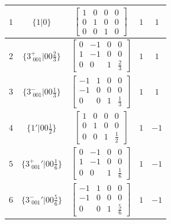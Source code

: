 \documentclass[fleqn,8pt]{jsarticle}
\begin{document}
\begin{longtable}{ccccc}
$ 1 $ & $ \{1|0\} $ & $ \begin{bmatrix} 1 & 0 & 0 & 0 \\ 0 & 1 & 0 & 0 \\ 0 & 0 & 1 & 0 \end{bmatrix} $ & $ 1 $ & $ 1 $ \\ \hline
$ 2 $ & $ \{3^{+}_{\,\,001}|0 0 \frac{2}{3}\} $ & $ \begin{bmatrix} 0 & -1 & 0 & 0 \\ 1 & -1 & 0 & 0 \\ 0 & 0 & 1 & \frac{2}{3} \end{bmatrix} $ & $ 1 $ & $ 1 $ \\ \hline
$ 3 $ & $ \{3^{-}_{\,\,001}|0 0 \frac{1}{3}\} $ & $ \begin{bmatrix} -1 & 1 & 0 & 0 \\ -1 & 0 & 0 & 0 \\ 0 & 0 & 1 & \frac{1}{3} \end{bmatrix} $ & $ 1 $ & $ 1 $ \\ \hline
$ 4 $ & $ \{1{}'|0 0 \frac{1}{2}\} $ & $ \begin{bmatrix} 1 & 0 & 0 & 0 \\ 0 & 1 & 0 & 0 \\ 0 & 0 & 1 & \frac{1}{2} \end{bmatrix} $ & $ 1 $ & $ -1 $ \\ \hline
$ 5 $ & $ \{3^{+}_{\,\,001}{}'|0 0 \frac{1}{6}\} $ & $ \begin{bmatrix} 0 & -1 & 0 & 0 \\ 1 & -1 & 0 & 0 \\ 0 & 0 & 1 & \frac{1}{6} \end{bmatrix} $ & $ 1 $ & $ -1 $ \\ \hline
$ 6 $ & $ \{3^{-}_{\,\,001}{}'|0 0 \frac{5}{6}\} $ & $ \begin{bmatrix} -1 & 1 & 0 & 0 \\ -1 & 0 & 0 & 0 \\ 0 & 0 & 1 & \frac{5}{6} \end{bmatrix} $ & $ 1 $ & $ -1 $ \\
\end{longtable}
\end{document}
